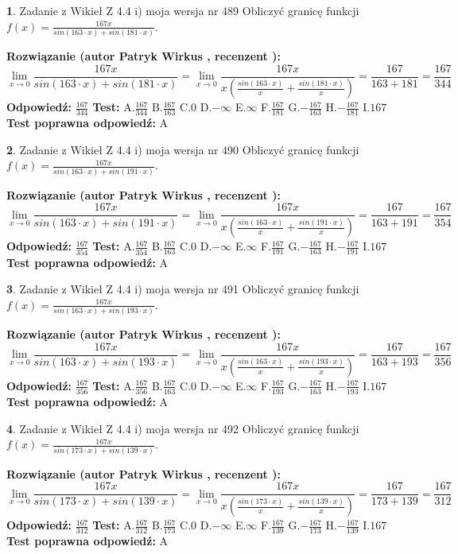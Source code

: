 \documentclass[12pt, a4paper]{article}
\theoremstyle{definition} %
\newtheorem{zad}{}
\newcommand{\zadStart}[1]{\begin{zad}#1\newline}
\newcommand{\zadStop}{\end{zad}}
\newcommand{\rozwStart}[2]{\noindent \textbf{Rozwiązanie (autor #1 , recenzent #2): }\newline}
\newcommand{\rozwStop}{\newline}
\newcommand{\odpStart}{\noindent \textbf{Odpowiedź:}\newline}
\newcommand{\odpStop}{\newline}
\newcommand{\testStart}{\noindent \textbf{Test:}\newline}
\newcommand{\testStop}{\newline}
\newcommand{\kluczStart}{\noindent \textbf{Test poprawna odpowiedź:}\newline}
\newcommand{\kluczStop}{\newline}
\begin{document}
\zadStart{Zadanie z Wikieł Z 4.4 i) moja wersja nr 489}
Obliczyć granicę funkcji $f(x)=\frac{167x}{sin(163\cdot x) +sin(181\cdot x)}$.
\zadStop
\rozwStart{Patryk Wirkus}{}
$$\lim\limits_{x\to 0}\frac{167x}{sin(163\cdot x) +sin(181\cdot x)}=\lim\limits_{x\to 0}\frac{167x}{x(\frac{sin(163\cdot x)}{x}+\frac{sin(181\cdot x)}{x})}=\frac{167}{163+181} = \frac{167}{344}$$
\rozwStop
\odpStart
$\frac{167}{344}$
\odpStop
\testStart
A.$\frac{167}{344}$
B.$\frac{167}{163}$
C.$0$
D.$-\infty$
E.$\infty$
F.$\frac{167}{181}$
G.$-\frac{167}{163}$
H.$-\frac{167}{181}$
I.$167$
\testStop
\kluczStart
A
\kluczStop



\zadStart{Zadanie z Wikieł Z 4.4 i) moja wersja nr 490}
Obliczyć granicę funkcji $f(x)=\frac{167x}{sin(163\cdot x) +sin(191\cdot x)}$.
\zadStop
\rozwStart{Patryk Wirkus}{}
$$\lim\limits_{x\to 0}\frac{167x}{sin(163\cdot x) +sin(191\cdot x)}=\lim\limits_{x\to 0}\frac{167x}{x(\frac{sin(163\cdot x)}{x}+\frac{sin(191\cdot x)}{x})}=\frac{167}{163+191} = \frac{167}{354}$$
\rozwStop
\odpStart
$\frac{167}{354}$
\odpStop
\testStart
A.$\frac{167}{354}$
B.$\frac{167}{163}$
C.$0$
D.$-\infty$
E.$\infty$
F.$\frac{167}{191}$
G.$-\frac{167}{163}$
H.$-\frac{167}{191}$
I.$167$
\testStop
\kluczStart
A
\kluczStop



\zadStart{Zadanie z Wikieł Z 4.4 i) moja wersja nr 491}
Obliczyć granicę funkcji $f(x)=\frac{167x}{sin(163\cdot x) +sin(193\cdot x)}$.
\zadStop
\rozwStart{Patryk Wirkus}{}
$$\lim\limits_{x\to 0}\frac{167x}{sin(163\cdot x) +sin(193\cdot x)}=\lim\limits_{x\to 0}\frac{167x}{x(\frac{sin(163\cdot x)}{x}+\frac{sin(193\cdot x)}{x})}=\frac{167}{163+193} = \frac{167}{356}$$
\rozwStop
\odpStart
$\frac{167}{356}$
\odpStop
\testStart
A.$\frac{167}{356}$
B.$\frac{167}{163}$
C.$0$
D.$-\infty$
E.$\infty$
F.$\frac{167}{193}$
G.$-\frac{167}{163}$
H.$-\frac{167}{193}$
I.$167$
\testStop
\kluczStart
A
\kluczStop



\zadStart{Zadanie z Wikieł Z 4.4 i) moja wersja nr 492}
Obliczyć granicę funkcji $f(x)=\frac{167x}{sin(173\cdot x) +sin(139\cdot x)}$.
\zadStop
\rozwStart{Patryk Wirkus}{}
$$\lim\limits_{x\to 0}\frac{167x}{sin(173\cdot x) +sin(139\cdot x)}=\lim\limits_{x\to 0}\frac{167x}{x(\frac{sin(173\cdot x)}{x}+\frac{sin(139\cdot x)}{x})}=\frac{167}{173+139} = \frac{167}{312}$$
\rozwStop
\odpStart
$\frac{167}{312}$
\odpStop
\testStart
A.$\frac{167}{312}$
B.$\frac{167}{173}$
C.$0$
D.$-\infty$
E.$\infty$
F.$\frac{167}{139}$
G.$-\frac{167}{173}$
H.$-\frac{167}{139}$
I.$167$
\testStop
\kluczStart
A
\kluczStop
\end{document}
